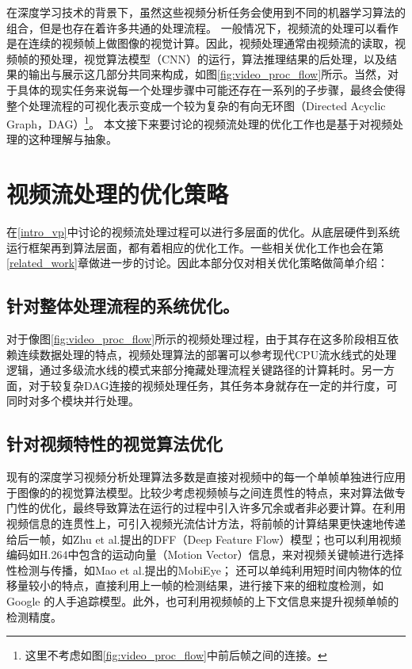 在深度学习技术的背景下，虽然这些视频分析任务会使用到不同的机器学习算法的组合，但是也存在着许多共通的处理流程。%
一般情况下，视频流的处理可以看作是在连续的视频帧上做图像的视觉计算。因此，视频处理通常由视频流的读取，视频帧的预处理，视觉算法模型（CNN）的运行，算法推理结果的后处理，以及结果的输出与展示这几部分共同来构成，如图\ref{fig:video_proc_flow}所示。当然，对于具体的现实任务来说每一个处理步骤中可能还存在一系列的子步骤，最终会使得整个处理流程的可视化表示变成一个较为复杂的有向无环图（Directed Acyclic Graph，DAG）\footnote{这里不考虑如图\ref{fig:video_proc_flow}中前后帧之间的连接。}。 本文接下来要讨论的视频流处理的优化工作也是基于对视频处理的这种理解与抽象。\par

\section{视频流处理的优化策略}\label{intro_opt}
在\ref{intro_vp}中讨论的视频流处理过程可以进行多层面的优化。从底层硬件到系统运行框架再到算法层面，都有着相应的优化工作。一些相关优化工作也会在第\ref{related_work}章做进一步的讨论。因此本部分仅对相关优化策略做简单介绍：\par

\subsection{针对整体处理流程的系统优化。}\label{sub:sys_opt}
对于像图\ref{fig:video_proc_flow}所示的视频处理过程，由于其存在这多阶段相互依赖连续数据处理的特点，视频处理算法的部署可以参考现代CPU流水线式的处理逻辑，通过多级流水线的模式来部分掩藏处理流程关键路径的计算耗时。另一方面，对于较复杂DAG连接的视频处理任务，其任务本身就存在一定的并行度，可同时对多个模块并行处理。
\subsection{针对视频特性的视觉算法优化}\label{sub:algo_opt}
现有的深度学习视频分析处理算法多数是直接对视频中的每一个单帧单独进行应用于图像的的视觉算法模型。比较少考虑视频帧与之间连贯性的特点，来对算法做专门性的优化，最终导致算法在运行的过程中引入许多冗余或者非必要计算。在利用视频信息的连贯性上，可引入视频光流估计方法，将前帧的计算结果更快速地传递给后一帧，如Zhu et al.提出的DFF（Deep Feature Flow）模型\cite{zhu2017deep}；也可以利用视频编码如H.264\cite{tourapis2003fast}中包含的运动向量（Motion Vector）信息，来对视频关键帧进行选择性检测与传播，如Mao et al.提出的MobiEye\cite{mao2019mobieye}；
还可以单纯利用短时间内物体的位移量较小的特点，直接利用上一帧的检测结果，进行接下来的细粒度检测，如Google 的人手追踪模型\cite{mediapipe_hand}。此外，也可利用视频帧的上下文信息来提升视频单帧的检测精度\cite{zhu2017flow}。
